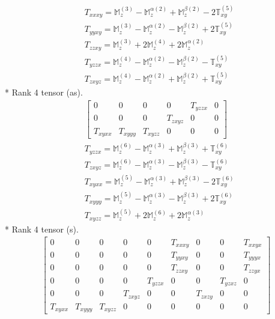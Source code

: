 \documentclass[fleqn,8pt,landscape]{jsarticle}
\begin{document}
\begin{align*}
& T_{xxxy} = \mathbb{M}_{z}^{(3)} - \mathbb{M}_{z}^{\alpha(2)} + \mathbb{M}_{z}^{\beta(2)} - 2 \mathbb{T}_{xy}^{(5)} \\
& T_{yyxy} = \mathbb{M}_{z}^{(3)} - \mathbb{M}_{z}^{\alpha(2)} - \mathbb{M}_{z}^{\beta(2)} + 2 \mathbb{T}_{xy}^{(5)} \\
& T_{zzxy} = \mathbb{M}_{z}^{(3)} + 2 \mathbb{M}_{z}^{(4)} + 2 \mathbb{M}_{z}^{\alpha(2)} \\
& T_{yzzx} = \mathbb{M}_{z}^{(4)} - \mathbb{M}_{z}^{\alpha(2)} - \mathbb{M}_{z}^{\beta(2)} - \mathbb{T}_{xy}^{(5)} \\
& T_{zxyz} = \mathbb{M}_{z}^{(4)} - \mathbb{M}_{z}^{\alpha(2)} + \mathbb{M}_{z}^{\beta(2)} + \mathbb{T}_{xy}^{(5)}
\end{align*}
* Rank 4 tensor (as).
\begin{align*}
\begin{bmatrix} 0 & 0 & 0 & 0 & T_{yzzx} & 0 \\ 0 & 0 & 0 & T_{zxyz} & 0 & 0 \\ T_{xyxx} & T_{xyyy} & T_{xyzz} & 0 & 0 & 0 \end{bmatrix}
\end{align*}
\begin{align*}
& T_{yzzx} = \mathbb{M}_{z}^{(6)} - \mathbb{M}_{z}^{\alpha(3)} + \mathbb{M}_{z}^{\beta(3)} + \mathbb{T}_{xy}^{(6)} \\
& T_{zxyz} = \mathbb{M}_{z}^{(6)} - \mathbb{M}_{z}^{\alpha(3)} - \mathbb{M}_{z}^{\beta(3)} - \mathbb{T}_{xy}^{(6)} \\
& T_{xyxx} = \mathbb{M}_{z}^{(5)} - \mathbb{M}_{z}^{\alpha(3)} + \mathbb{M}_{z}^{\beta(3)} - 2 \mathbb{T}_{xy}^{(6)} \\
& T_{xyyy} = \mathbb{M}_{z}^{(5)} - \mathbb{M}_{z}^{\alpha(3)} - \mathbb{M}_{z}^{\beta(3)} + 2 \mathbb{T}_{xy}^{(6)} \\
& T_{xyzz} = \mathbb{M}_{z}^{(5)} + 2 \mathbb{M}_{z}^{(6)} + 2 \mathbb{M}_{z}^{\alpha(3)}
\end{align*}
* Rank 4 tensor (s).
\begin{align*}
\begin{bmatrix} 0 & 0 & 0 & 0 & 0 & T_{xxxy} & 0 & 0 & T_{xxyx} \\ 0 & 0 & 0 & 0 & 0 & T_{yyxy} & 0 & 0 & T_{yyyx} \\ 0 & 0 & 0 & 0 & 0 & T_{zzxy} & 0 & 0 & T_{zzyx} \\ 0 & 0 & 0 & 0 & T_{yzzx} & 0 & 0 & T_{yzxz} & 0 \\ 0 & 0 & 0 & T_{zxyz} & 0 & 0 & T_{zxzy} & 0 & 0 \\ T_{xyxx} & T_{xyyy} & T_{xyzz} & 0 & 0 & 0 & 0 & 0 & 0 \end{bmatrix}
\end{align*}
\end{document}
